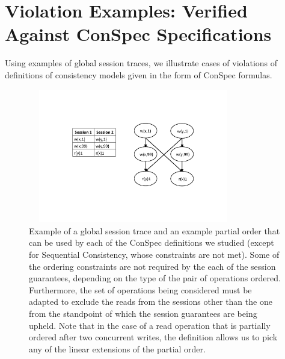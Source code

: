 \documentclass[journal,compsoc]{IEEEtran}
\begin{document}
 

\section{Violation Examples: Verified \\ Against ConSpec Specifications}\label{sec:examples}
  Using examples of global session traces, we illustrate cases of violations of definitions of consistency models given in the form of   ConSpec formulas.  
    \begin{figure}%
        \includegraphics[width=3.6in,height=2.3in]
                    {examplepo} %
        \caption{Example of a global session trace and an example partial order that %
         can be used by each of the ConSpec definitions we studied (except for Sequential Consistency, whose constraints are not met). Some of the ordering constraints are not required by the each of the session guarantees, depending on the type of the pair of operations ordered. Furthermore, the set of operations being considered must be adapted to exclude the reads from the sessions other than the one from the standpoint of which the session guarantees are being upheld. Note that in the case of a read operation that is partially ordered after two concurrent writes, the definition allows us to pick any of the linear extensions of the partial order.}
        \label{fig:example}
\end{figure}
\end{document}
